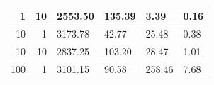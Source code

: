 \documentclass[12pt,a4paper,twoside,openright]{report}
\begin{document}
\begin{table}[H]
\begin{tabular}{|r|r|l|l|l|l|}
1                                                                                                & 10                                                                                                                         & 2553.50                                                                                                                                         & 135.39                                                                                                                           & 3.39                                                                                                     & 0.16                                                                                                                             \\ \hline
10                                                                                               & 1                                                                                                                          & 3173.78                                                                                                                                         & 42.77                                                                                                                            & 25.48                                                                                                    & 0.38                                                                                                                             \\ \hline
10                                                                                               & 10                                                                                                                         & 2837.25                                                                                                                                         & 103.20                                                                                                                           & 28.47                                                                                                    & 1.01                                                                                                                             \\ \hline
100                                                                                              & 1                                                                                                                          & 3101.15                                                                                                                                         & 90.58                                                                                                                            & 258.46                                                                                                   & 7.68                                                                                                                             \\ \hline

\end{tabular}
\end{table}
\end{document}
